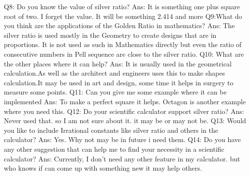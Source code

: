 \documentclass{article}
\begin{document}
Q8: Do you know the value of silver ratio?\newline
Ans: It is something one plus square root of two. I forget the value. It will be something 2.414 and more \newline\newline
Q9:What do you think are the applications of the Golden Ratio in mathematics?\newline
Ans: The silver ratio is used mostly in the Geometry to create designs that are in proportions. It is not used as such in Mathematics directly but even the ratio of consecutive numbers in Pell sequence are close to the silver ratio. \newline\newline
Q10: What are the other places where it can help?\newline
Ans: It is usually used in the geometrical calculation.As well as the architect and engineers uses this to make shapes calculation.It may be used in art and design, some time it helps in surgery to measure some points.  \newline\newline
Q11: Can you give me some example where it can be implemented\newline
Ans: To make a perfect square it helps. Octagon is another example where you need this.\newline\newline
Q12: Do your scientific calculator support silver ratio?\newline
Ans: Never used that. so I am not sure about it. it may be or may not be.\newline\newline
Q13: Would you like to include Irrational constants like silver ratio and others in the calculator? \newline
Ans: Yes. Why not may be in future i need them.\newline\newline
Q14: Do you have any other suggestion that can help me to find your necessity in a scientific calculator?\newline
Ans: Currently, I don't need any other feature in my calculator. but who knows if can come up with something new it may help others.\newline\newline
\end{document}
